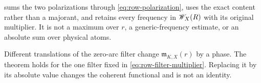 \begin{remark}
 sums the two polarizations through
\eqref{eq:row-polarization}, uses the exact content rather than a
majorant, and retains every frequency in \(\mathscr W_X(R)\) with its
original multiplier.  It is not a maximum over \(r\), a
generic-frequency estimate, or an absolute sum over physical atoms.
\end{remark}

\begin{remark}
Different translations of the zero-arc filter change
\(\mathfrak m_{K,X}(r)\) by a phase.  The theorem holds for the one
filter fixed in \eqref{eq:row-filter-multiplier}.  Replacing it by its
absolute value changes the coherent functional and is not an
identity.
\end{remark}

